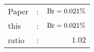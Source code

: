       \begin{tabular}{lcr}
          Paper &:& $\mathrm{Br}  = 0.021\%$ \\
          this      &:& $\mathrm{Br}  = 0.021\%$ \\
		  ratio   &:& $1.02$ \\
      \end{tabular}
